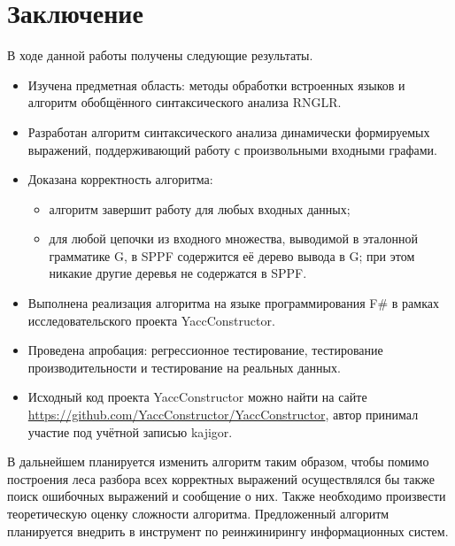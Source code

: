 \clearpage

\section*{Заключение}
В ходе данной работы получены следующие результаты. 
\begin{itemize}
  \item Изучена предметная область: методы обработки встроенных языков и алгоритм обобщённого синтаксического анализа RNGLR.
  \item Разработан алгоритм синтаксического анализа динамически формируемых выражений, поддерживающий работу с произвольными входными графами.
  \item Доказана корректность алгоритма:
  \begin{itemize}
    \item алгоритм завершит работу для любых входных данных;
    \item для любой цепочки из входного множества, выводимой в эталонной грамматике G, в SPPF содержится её дерево вывода в G; при этом никакие другие деревья не содержатся в SPPF.
  \end{itemize}
  \item Выполнена реализация алгоритма на языке программирования F\# в рамках исследовательского проекта YaccConstructor.
  \item Проведена апробация: регрессионное тестирование, тестирование производительности и тестирование на реальных данных.
  \item Исходный код проекта YaccConstructor можно найти на сайте \url{https://github.com/YaccConstructor/YaccConstructor}, автор принимал участие под учётной записью kajigor.
\end{itemize}

В дальнейшем планируется изменить алгоритм таким образом, чтобы помимо 
построения леса разбора всех корректных выражений осуществлялся бы также поиск ошибочных выражений и сообщение о них. Также необходимо произвести теоретическую оценку сложности алгоритма. Предложенный алгоритм планируется внедрить в инструмент по реинжинирингу информационных систем.  